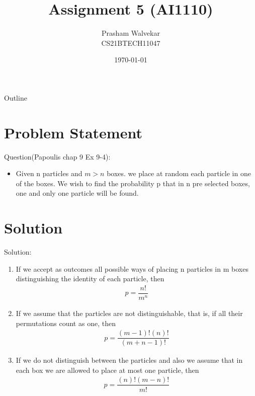 \documentclass{beamer}
\title{Assignment 5 (AI1110)}
\author{Prasham Walvekar\\
        CS21BTECH11047}
\date{\today}
\begin{document}
\begin{frame}
    \titlepage 
\end{frame}

\logo{}


\begin{frame}{Outline}
    \tableofcontents
\end{frame}


\section{Problem Statement}
\begin{frame}{Question(Papoulis chap 9 Ex 9-4):}

\begin{itemize}
    \item Given n particles and $m > n$ boxes. we place at random each particle in one of the 
boxes. We wish to find the probability p that in n pre selected boxes, one and only one particle will be found. 
\end{itemize}
\end{frame}
\section{Solution}
\begin{frame}{Solution:}
   \begin{enumerate}
       \item If we accept as outcomes all possible ways of placing n particles in m boxes distinguishing the identity of each particle, then
       \begin{align}
           p =\dfrac{n!}{m^n}        
           \end{align}
        \item If we assume that the particles are not distinguishable, that is, if all their permutations count as one, then
        \begin{align}
            p =\dfrac{(m-1)!(n)!}{(m+n-1)!} 
        \end{align}
         \item If we do not distinguish between the particles and also we assume that in each box we are allowed to place at most one particle, then 
         \begin{align}
             p =\dfrac{(n)!(m-n)!}{m!}
         \end{align}
     \end{enumerate}
    
\end{frame}
\end{document}
